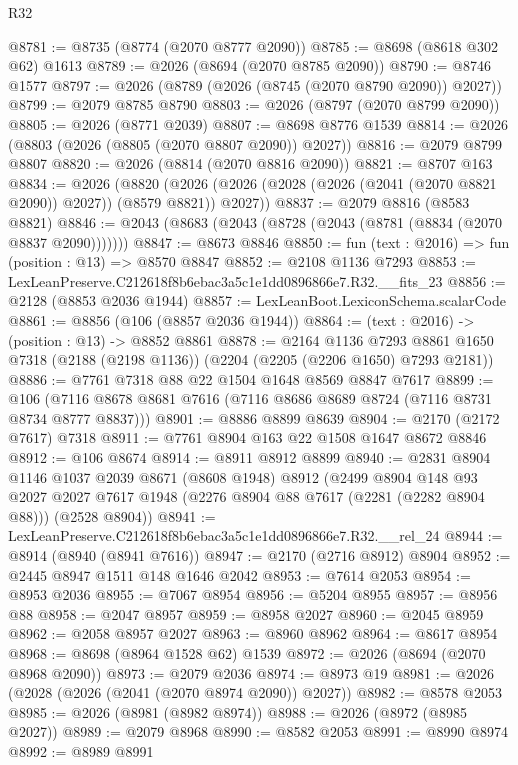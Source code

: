 \begin{lexlean}{R32}
\begin{coremodule}
@8781 := @8735 (@8774 (@2070 @8777 @2090))
@8785 := @8698 (@8618 @302 @62) @1613
@8789 := @2026 (@8694 (@2070 @8785 @2090))
@8790 := @8746 @1577
@8797 := @2026 (@8789 (@2026 (@8745 (@2070 @8790 @2090)) @2027))
@8799 := @2079 @8785 @8790
@8803 := @2026 (@8797 (@2070 @8799 @2090))
@8805 := @2026 (@8771 @2039)
@8807 := @8698 @8776 @1539
@8814 := @2026 (@8803 (@2026 (@8805 (@2070 @8807 @2090)) @2027))
@8816 := @2079 @8799 @8807
@8820 := @2026 (@8814 (@2070 @8816 @2090))
@8821 := @8707 @163
@8834 := @2026
    (@8820 (@2026 (@2026 (@2028 (@2026 (@2041 (@2070 @8821 @2090)) @2027)) (@8579 @8821)) @2027))
@8837 := @2079 @8816 (@8583 @8821)
@8846 := @2043 (@8683 (@2043 (@8728 (@2043 (@8781 (@8834 (@2070 @8837 @2090)))))))
@8847 := @8673 @8846
@8850 := fun (text : @2016) => fun (position : @13) => @8570 @8847
@8852 := @2108 @1136 @7293
@8853 := LexLeanPreserve.C212618f8b6ebac3a5c1e1dd0896866e7.R32.__fits_23
@8856 := @2128 (@8853 @2036 @1944)
@8857 := LexLeanBoot.LexiconSchema.scalarCode
@8861 := @8856 (@106 (@8857 @2036 @1944))
@8864 := (text : @2016) -> (position : @13) -> @8852 @8861
@8878 := @2164
    @1136
    @7293
    @8861
    @1650
    @7318
    (@2188 (@2198 @1136))
    (@2204 (@2205 (@2206 @1650) @7293 @2181))
@8886 := @7761 @7318 @88 @22 @1504 @1648 @8569 @8847 @7617
@8899 := @106 (@7116 @8678 @8681 @7616 (@7116 @8686 @8689 @8724 (@7116 @8731 @8734 @8777 @8837)))
@8901 := @8886 @8899 @8639
@8904 := @2170 (@2172 @7617) @7318
@8911 := @7761 @8904 @163 @22 @1508 @1647 @8672 @8846
@8912 := @106 @8674
@8914 := @8911 @8912 @8899
@8940 := @2831
    @8904
    @1146
    @1037
    @2039
    @8671
    (@8608 @1948)
    @8912
    (@2499
      @8904
      @148
      @93
      @2027
      @2027
      @7617
      @1948
      (@2276 @8904 @88 @7617 (@2281 (@2282 @8904 @88)))
      (@2528 @8904))
@8941 := LexLeanPreserve.C212618f8b6ebac3a5c1e1dd0896866e7.R32.__rel_24
@8944 := @8914 (@8940 (@8941 @7616))
@8947 := @2170 (@2716 @8912) @8904
@8952 := @2445 @8947 @1511 @148 @1646 @2042
@8953 := @7614 @2053
@8954 := @8953 @2036
@8955 := @7067 @8954
@8956 := @5204 @8955
@8957 := @8956 @88
@8958 := @2047 @8957
@8959 := @8958 @2027
@8960 := @2045 @8959
@8962 := @2058 @8957 @2027
@8963 := @8960 @8962
@8964 := @8617 @8954
@8968 := @8698 (@8964 @1528 @62) @1539
@8972 := @2026 (@8694 (@2070 @8968 @2090))
@8973 := @2079 @2036
@8974 := @8973 @19
@8981 := @2026 (@2028 (@2026 (@2041 (@2070 @8974 @2090)) @2027))
@8982 := @8578 @2053
@8985 := @2026 (@8981 (@8982 @8974))
@8988 := @2026 (@8972 (@8985 @2027))
@8989 := @2079 @8968
@8990 := @8582 @2053
@8991 := @8990 @8974
@8992 := @8989 @8991

\end{coremodule}
\end{lexlean}
